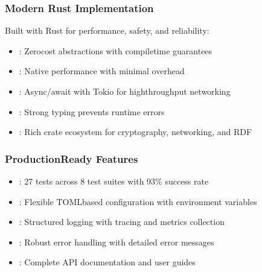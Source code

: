 \documentclass[letterpaper,10pt,english]{sphinxmanual}
\begin{document}
\subsubsection{Modern Rust Implementation}
\label{\detokenize{overview/index:modern-rust-implementation}}
\sphinxAtStartPar
Built with Rust for performance, safety, and reliability:
\begin{itemize}
\item {} 
\sphinxAtStartPar
{}: Zero\sphinxhyphen{}cost abstractions with compile\sphinxhyphen{}time guarantees

\item {} 
\sphinxAtStartPar
{}: Native performance with minimal overhead

\item {} 
\sphinxAtStartPar
{}: Async/await with Tokio for high\sphinxhyphen{}throughput networking

\item {} 
\sphinxAtStartPar
{}: Strong typing prevents runtime errors

\item {} 
\sphinxAtStartPar
{}: Rich crate ecosystem for cryptography, networking, and RDF

\end{itemize}


\subsubsection{Production\sphinxhyphen{}Ready Features}
\label{\detokenize{overview/index:production-ready-features}}\begin{itemize}
\item {} 
\sphinxAtStartPar
{}: 27 tests across 8 test suites with 93\% success rate

\item {} 
\sphinxAtStartPar
{}: Flexible TOML\sphinxhyphen{}based configuration with environment variables

\item {} 
\sphinxAtStartPar
{}: Structured logging with tracing and metrics collection

\item {} 
\sphinxAtStartPar
{}: Robust error handling with detailed error messages

\item {} 
\sphinxAtStartPar
{}: Complete API documentation and user guides

\end{itemize}
\end{document}
